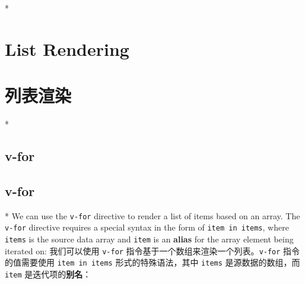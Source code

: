 \begin{paracol}{2}
\switchcolumn[0]*%
\section{List Rendering}
\switchcolumn
\section{列表渲染}
\switchcolumn[0]*%
\subsection{v-for}
\switchcolumn
\subsection{v-for}
\switchcolumn[0]*%
We can use the \texttt{v-for} directive to render a list of items based
on an array. The \texttt{v-for} directive requires a special syntax in
the form of \texttt{item\ in\ items}, where \texttt{items} is the source
data array and \texttt{item} is an \textbf{alias} for the array element
being iterated on:
\switchcolumn
我们可以使用 \texttt{v-for}
指令基于一个数组来渲染一个列表。\texttt{v-for} 指令的值需要使用
\texttt{item\ in\ items} 形式的特殊语法，其中 \texttt{items}
是源数据的数组，而 \texttt{item} 是迭代项的\textbf{别名}：


\end{paracol}
